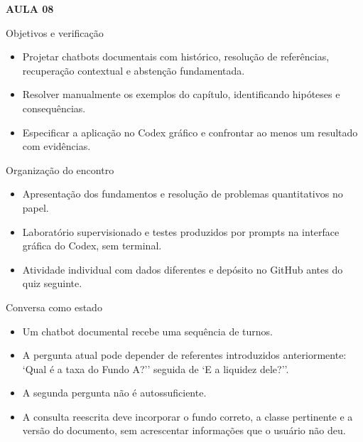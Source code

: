 \documentclass[10pt,aspectratio=169]{beamer}
\begin{document}
\begin{frame}[t]{}
\vspace{14mm}\textcolor{InsperRed}{\bfseries AULA 08}\par\vspace{4mm}{\LARGE\bfseries Sistemas conversacionais (chatbots)}\par\vspace{6mm}{\large Finanças}\par{}
\end{frame}

\begin{frame}[t]{Objetivos e verificação}
\small
\begin{itemize}
\item Projetar chatbots documentais com histórico, resolução de referências, recuperação contextual e abstenção fundamentada.
\item Resolver manualmente os exemplos do capítulo, identificando hipóteses e consequências.
\item Especificar a aplicação no Codex gráfico e confrontar ao menos um resultado com evidências.
\end{itemize}
\end{frame}

\begin{frame}[t]{Organização do encontro}
\small
\begin{itemize}
\item Apresentação dos fundamentos e resolução de problemas quantitativos no papel.
\item Laboratório supervisionado e testes produzidos por prompts na interface gráfica do Codex, sem terminal.
\item Atividade individual com dados diferentes e depósito no GitHub antes do quiz seguinte.
\end{itemize}
\end{frame}

\begin{frame}[t]{Conversa como estado}
\small
\begin{itemize}
\item Um chatbot documental recebe uma sequência de turnos.
\item A pergunta atual pode depender de referentes introduzidos anteriormente: `Qual é a taxa do Fundo A?'' seguida de `E a liquidez dele?''.
\item A segunda pergunta não é autossuficiente.
\item A consulta reescrita deve incorporar o fundo correto, a classe pertinente e a versão do documento, sem acrescentar informações que o usuário não deu.
\end{itemize}
\end{frame}
\end{document}
